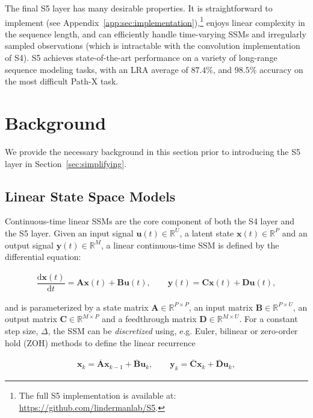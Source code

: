 The final S5 layer has many desirable properties. It is straightforward to implement (see Appendix~\ref{app:sec:implementation}),\footnote{The full S5 implementation is available at: \url{https://github.com/lindermanlab/S5}.} enjoys linear complexity in the sequence length, and can efficiently handle time-varying SSMs and irregularly sampled observations (which is intractable with the convolution implementation of S4).  S5 achieves state-of-the-art performance on a variety of long-range sequence modeling tasks, with an LRA average of ${87.4\%}$, and ${98.5\%}$ accuracy on the most difficult Path-X task. 

\section{Background}
\label{genbackground}
We provide the necessary background in this section prior to introducing the S5 layer in Section~\ref{sec:simplifying}. 

\subsection{Linear State Space Models}
\label{subsec:ssm}
Continuous-time linear SSMs are the core component of both the S4 layer and the S5 layer.  Given an input signal $\mathbf{u}(t)\in \mathbb{R}^U$, a latent state $\mathbf{x}(t)\in \mathbb{R}^P$ and an output signal $\mathbf{y}(t)\in \mathbb{R}^{M}$, a linear continuous-time SSM is defined by the differential equation:

\begin{align}
    \dfrac{\mathrm{d} \mathbf{x}(t)}{\mathrm{d} t} = \mathbf{A}\mathbf{x}(t) + \mathbf{B}\mathbf{u}(t), \quad \quad \mathbf{y}(t) = \mathbf{C}\mathbf{x}(t) + \mathbf{D}\mathbf{u}(t) , \label{eq:cont_ssm} 
\end{align}

and is parameterized by a state matrix $\mathbf{A}\in \mathbb{R}^{P \times P}$, an input matrix $\mathbf{B}\in \mathbb{R}^{P \times U}$, an output matrix $\mathbf{C}\in \mathbb{R}^{M \times P}$ and a feedthrough matrix $\mathbf{D}\in \mathbb{R}^{M \times U}$.  For a constant step size, $\Delta$, the SSM can be \emph{discretized} using, e.g. Euler, bilinear or zero-order hold (ZOH) methods to define the linear recurrence

\begin{align}
    \mathbf{x}_k = \overline{\mathbf{A}}\mathbf{x}_{k-1} + \overline{\mathbf{B}}\mathbf{u}_k, \quad \quad \mathbf{y}_k = \overline{\mathbf{C}}\mathbf{x}_k + \overline{\mathbf{D}}\mathbf{u}_k, \label{eq:discrete_ssm}
\end{align}

